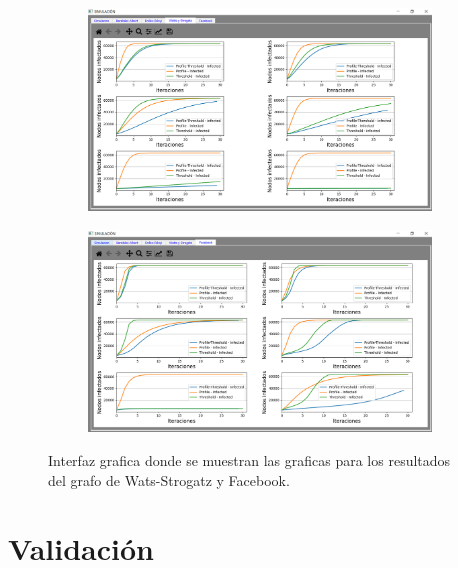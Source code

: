 \documentclass{article}
\begin{document}
\begin{figure}[!tbp]
	\begin{subfigure}[b]{1\textwidth}
		\includegraphics[width=\textwidth]{../Images/GUI_3.PNG}
		\caption{}
		\label{fig:gui3}
	\end{subfigure}
	\hfill
	\begin{subfigure}[b]{1\textwidth}
	\includegraphics[width=\textwidth]{../Images/GUI_4.PNG}
	\caption{}
	\label{fig:gui4}
	\end{subfigure}
	\label{fig:graficas}
	\caption{Interfaz grafica donde se muestran las graficas para los resultados del grafo de Wats-Strogatz y Facebook.}
\end{figure}
\newpage
\section{Validación}
\end{document}
